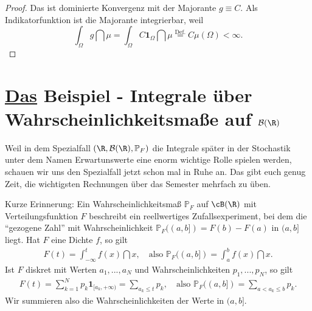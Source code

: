 \begin{proof}
	Das ist dominierte Konvergenz mit der Majorante $ g \equiv C$. Als Indikatorfunktion ist die Majorante integrierbar, weil \[ \int_{\Omega} g \dint \mu = \int_{\Omega} C \mathbf{1}_{\Omega} \dint \mu \overset{\text{Def.}}{=} C \mu(\Omega) < \infty. \]
\end{proof}
\section[Integrale f\"ur \underline{das}{ }Beispiel ]{{\underline{Das} \platz Beispiel} - Integrale \"uber Wahrscheinlichkeitsma\ss e auf $\mathcal B(\R)$}
Weil in dem Spezialfall $(\R, \mathcal B(\R),\mathbb{P}_F)$ die Integrale sp\"ater in der Stochastik unter dem Namen \glqq Erwartunswerte\grqq{} eine enorm wichtige Rolle spielen werden, schauen wir uns den Spezialfall jetzt schon mal in Ruhe an. Das gibt euch genug Zeit, die wichtigsten Rechnungen \"uber das Semester mehrfach zu \"uben.\smallskip

Kurze Erinnerung: Ein Wahrscheinlichkeitsmaß $\mathbb{P}_F$ auf $\cB(\R)$ mit Verteilungsfunktion $F$ beschreibt ein reellwertiges Zufallsexperiment, bei dem die \enquote{gezogene Zahl}  mit Wahrscheinlichkeit $\mathbb{P}_F((a,b]) = F(b) - F(a)$ in $(a,b]$ liegt. Hat $F$ eine Dichte $f$, so gilt
\begin{align*}
	F(t)=\int_{-\infty}^t f(x)\dint x,\quad\text{also } \mathbb{P}_F((a,b])=\int_a^bf(x)\dint x.
\end{align*}	
Ist $F$ diskret mit Werten $a_1,...,a_N$ und Wahrscheinlichkeiten $p_1,...,p_N$, so gilt
\begin{align*}
	F(t)=\sum_{k=1}^N p_k\mathbf 1_{[a_k,+\infty)}=\sum_{a_k\leq t} p_k,\quad\text{also }\mathbb{P}_F((a,b])=\sum_{a<a_k\leq b} p_k.
\end{align*}
Wir summieren also die Wahrscheinlichkeiten der Werte in $(a,b]$.\smallskip


